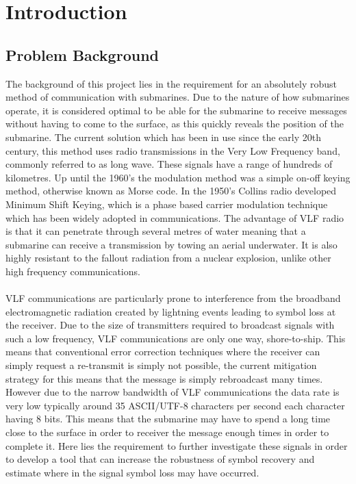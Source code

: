 \chapter{Introduction}
\section{Problem Background}
The background of this project lies in the requirement for an absolutely robust method of communication with submarines. Due to the nature of how submarines operate, it is considered optimal to be able for the submarine to receive messages without having to come to the surface, as this quickly reveals the position of the submarine. The current solution which has been in use since the early 20th century, this method uses radio transmissions in the Very Low Frequency band, commonly referred to as long wave. These signals have a range of hundreds of kilometres. Up until the 1960's the modulation method was a simple on-off keying method, otherwise known as Morse code. In the 1950's Collins radio developed Minimum Shift Keying, which is a phase based carrier modulation technique which has been widely adopted in communications. The  advantage of VLF radio is that it can penetrate through several metres of water meaning that a submarine can receive a transmission by towing an aerial underwater. It is also highly resistant to the fallout radiation from a nuclear explosion, unlike other high frequency communications.
\\\\
VLF communications are particularly prone to interference from the broadband electromagnetic radiation created by lightning events leading to symbol loss at the receiver. Due to the size of transmitters required to broadcast signals with such a low frequency, VLF communications are only one way, shore-to-ship. This means that conventional error correction techniques where the receiver can simply request a re-transmit is simply not possible, the current mitigation strategy for this means that the message is simply rebroadcast many times. However due to the narrow bandwidth of VLF communications the data rate is very low typically around 35 ASCII/UTF-8 characters per second each character having 8 bits. This means that the submarine may have to spend a long time close to the surface in order to receiver the message enough times in order to complete it. Here lies the requirement to further investigate these signals in order to develop a tool that can increase the robustness of symbol recovery and estimate where in the signal symbol loss may have occurred.

